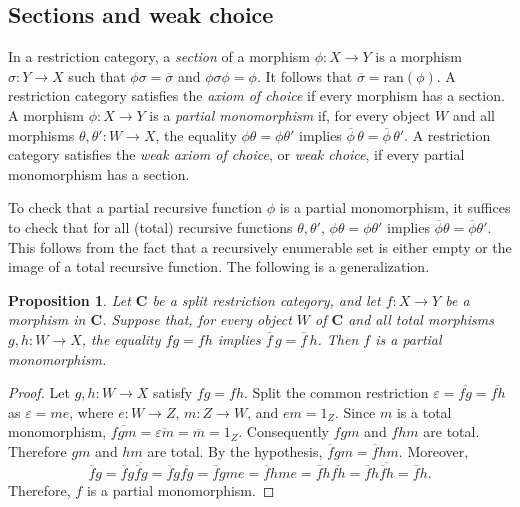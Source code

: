 \documentclass[letterpaper,10pt]{amsart}
\theoremstyle{plain}
\newtheorem{prop}[thm]{Proposition}
\theoremstyle{definition}
\newcommand{\MAP}[3]{{#1}:{#2}\rightarrow{#3}}
\newcommand{\rst}[1]{\overline{#1}}
\begin{document}
\subsection{Sections and weak choice}
In a restriction category, a {\it section} of a morphism
$\MAP{\phi}{X}{Y}$  is a morphism $\MAP{\sigma}{Y}{X}$ such that
$\phi\sigma=\rst\sigma$ and $\phi\sigma\phi=\phi$. It follows that
$\rst{\sigma}=\mathrm{ran}(\phi)$. A
restriction category satisfies the {\it axiom of choice} if every morphism
has a section. A morphism $\phi:X\to Y$ is a \textit{partial monomorphism}
if, for every object $W$ and all morphisms $\theta,\theta':W\to X$,
the equality $\phi\theta=\phi\theta'$ implies
$\rst\phi\,\theta=\rst\phi\,\theta'$.
A restriction category satisfies the \textit{weak axiom of choice},
or \textit{weak choice}, if every partial monomorphism has a section.

To check that a partial recursive function $\phi$ is a partial monomorphism, it suffices to check that for all (total) recursive functions $\theta,\theta'$, $\phi\theta=\phi\theta'$ implies $\rst\phi\theta=\rst\phi\theta'$. This follows from the fact that a recursively enumerable set is either empty or the image of a total recursive function. The following is a generalization.

\begin{prop}\label{PropPartialMono}
Let $\mathbf{C}$ be a split restriction category, and let $\MAP{f}{X}{Y}$ be a morphism in $\mathbf{C}$. Suppose that, for every object $W$ of $\mathbf C$ and all total
morphisms $g,h:W\to X$, the equality $fg=fh$ implies
$\rst f\,g=\rst f\,h$. 
Then $f$ is a partial monomorphism.
\end{prop}

\begin{proof}
Let $g,h:W\to X$ satisfy $fg=fh$. Split the common restriction
$\varepsilon=\rst{fg}=\rst{fh}$ as $\varepsilon=me$, where
$e:W\to Z$, $m:Z\to W$, and $em=1_Z$. Since $m$ is a total monomorphism,
$\rst{fgm}=\rst{\varepsilon m}=\rst m=1_Z$.
Consequently $fgm$ and $fhm$ are total. 
Therefore
$g m$ and $h m$ are total. By the hypothesis, $\rst{f}g m = \rst{f}h m$. Moreover,
\[
\rst{f}g = \rst{f}g\rst{\rst{f}g} = \rst{f}g\rst{fg}
         = \rst{f}gme =\rst{f}hme =\rst{f}h\rst{fh}
         =\rst{f}h\rst{\rst{f}h} = \rst{f}h.
\]
Therefore, $f$ is a partial monomorphism.
\end{proof}
\end{document}
